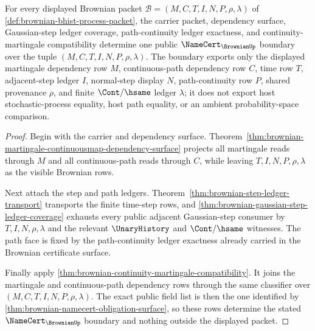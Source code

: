 \begin{theorem}
\label{thm:brownian-step-path-namecert-closure-boundary}
For every displayed Brownian packet
$\mathcal{B}=(M,C,T,I,N,P,\rho,\lambda)$ of
\autoref{def:brownian-bhist-process-packet}, the carrier packet, dependency
surface, Gaussian-step ledger coverage, path-continuity ledger exactness, and
continuity-martingale compatibility determine one public
$\NameCert_{\BrownianUp}$ boundary over the tuple
$(M,C,T,I,N,P,\rho,\lambda)$. The boundary exports only the displayed
martingale dependency row $M$, continuous-path dependency row $C$, time row
$T$, adjacent-step ledger $I$, normal-step display $N$, path-continuity row
$P$, shared provenance $\rho$, and finite $\Cont/\hsame$ ledger $\lambda$; it
does not export host stochastic-process equality, host path equality, or an
ambient probability-space comparison.
\end{theorem}
\begin{proof}
Begin with the carrier and dependency surface. Theorem~\ref{thm:brownian-martingale-continuousmap-dependency-surface}
projects all martingale reads through $M$ and all continuous-path reads through
$C$, while leaving $T,I,N,P,\rho,\lambda$ as the visible Brownian rows.

Next attach the step and path ledgers. Theorem~\ref{thm:brownian-step-ledger-transport}
transports the finite time-step rows, and
\autoref{thm:brownian-gaussian-step-ledger-coverage} exhausts every public
adjacent Gaussian-step consumer by $T,I,N,\rho,\lambda$ and the relevant
$\UnaryHistory$ and $\Cont/\hsame$ witnesses. The path face is fixed by the
path-continuity ledger exactness already carried in the Brownian certificate
surface.

Finally apply
\autoref{thm:brownian-continuity-martingale-compatibility}. It joins the
martingale and continuous-path dependency rows through the same classifier over
$(M,C,T,I,N,P,\rho,\lambda)$. The exact public field list is then the one
identified by \autoref{thm:brownian-namecert-obligation-surface}, so these
rows determine the stated $\NameCert_{\BrownianUp}$ boundary and nothing
outside the displayed packet.
\end{proof}

